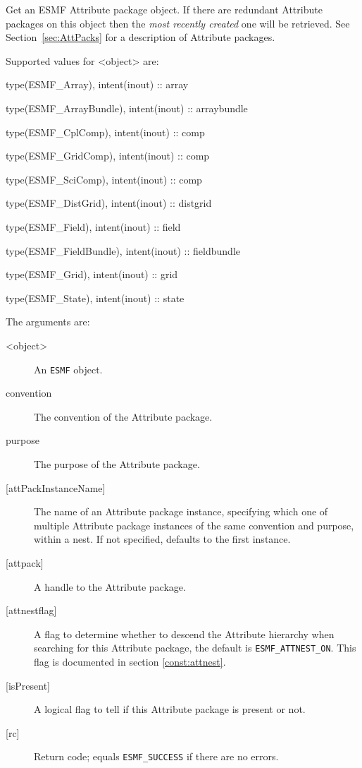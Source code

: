    Get an ESMF Attribute package object. If there are redundant Attribute
   packages on this object then the {\it most recently created} one will be
   retrieved.
   See Section~\ref{sec:AttPacks} for a description of Attribute packages.
  
   Supported values for <object> are:
   \begin{description}
   \item type(ESMF\_Array), intent(inout) :: array
   \item type(ESMF\_ArrayBundle), intent(inout) :: arraybundle
   \item type(ESMF\_CplComp), intent(inout) :: comp
   \item type(ESMF\_GridComp), intent(inout) :: comp
   \item type(ESMF\_SciComp), intent(inout) :: comp
   \item type(ESMF\_DistGrid), intent(inout) :: distgrid
   \item type(ESMF\_Field), intent(inout) :: field
   \item type(ESMF\_FieldBundle), intent(inout) :: fieldbundle
   \item type(ESMF\_Grid), intent(inout) :: grid
   \item type(ESMF\_State), intent(inout) :: state
   \end{description}
  
   The arguments are:
   \begin{description}
   \item [<object>]
   An {\tt ESMF} object.
   \item [convention]
   The convention of the Attribute package.
   \item [purpose]
   The purpose of the Attribute package.
   \item [{[attPackInstanceName]}]
   The name of an Attribute package instance, specifying which one
   of multiple Attribute package instances of the same convention
   and purpose, within a nest. If not specified, defaults to the
   first instance.
   \item [{[attpack]}]
   A handle to the Attribute package.
   \item [{[attnestflag]}]
   A flag to determine whether to descend the
   Attribute hierarchy when searching for this Attribute package, the
   default is {\tt ESMF\_ATTNEST\_ON}. This flag is documented in
   section \ref{const:attnest}.
   \item [{[isPresent]}]
   A logical flag to tell if this Attribute package is present or not.
   \item [{[rc]}]
   Return code; equals {\tt ESMF\_SUCCESS} if there are no errors.
   \end{description}
  
